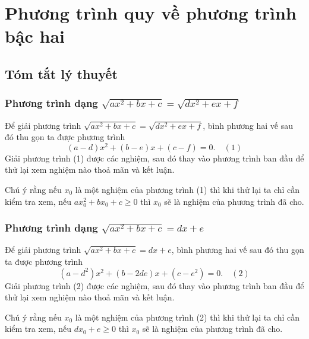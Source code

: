 \setcounter{dang}{0}
\section{Phương trình quy về phương trình bậc hai}
\subsection{Tóm tắt lý thuyết}
\subsubsection{Phương trình dạng $\sqrt{a x^{2}+b x+c}=\sqrt{d x^{2}+e x+f}$}
Để giải phương trình $\sqrt{a x^{2}+b x+c}=\sqrt{d x^{2}+e x+f}$, bình phương hai vế sau đó thu gọn ta được phương trình
$$
(a-d) x^{2}+(b-e) x+(c-f)=0. \quad (1)
$$
Giải phương trình (1) được các nghiệm, sau đó thay vào phương trình ban đầu để thử lại xem nghiệm nào thoả mãn và kết luận.

Chú ý rằng nếu $x_{0}$ là một nghiệm của phương trình (1) thì khi thử lại ta chỉ cần kiểm tra xem, nếu $a x_{0}^{2}+b x_{0}+c \geq 0$ thì $x_{0}$ sẽ là nghiệm của phương trình đã cho.
\subsubsection{Phương trình dạng $\sqrt{a x^{2}+b x+c}=d x+e$}
Để giải phương trình $\sqrt{a x^{2}+b x+c}=d x+e$, bình phương hai vế sau đó thu gọn ta được phương trình
$$
\left(a-d^{2}\right) x^{2}+(b-2 d e) x+\left(c-e^{2}\right)=0. \quad (2)
$$
Giải phương trình (2) được các nghiệm, sau đó thay vào phương trình ban đầu để thử lại xem nghiệm nào thoả mãn và kết luận.

Chú ý rằng nếu $x_{0}$ là một nghiệm của phương trình (2) thì khi thử lại ta chỉ cần kiểm tra xem, nếu $d x_{0}+e \geq 0$ thì $x_{0}$ sẽ là nghiệm của phương trình đã cho.


